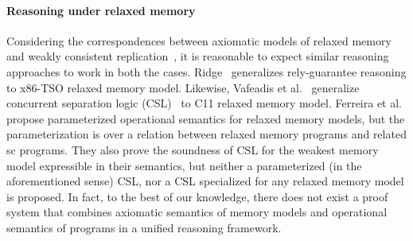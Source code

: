 \paragraph{Reasoning under relaxed memory} Considering the
correspondences between axiomatic models of relaxed
memory~\cite{battycpp} and weakly consistent
replication~\cite{burckhardt14}, it is reasonable to expect similar
reasoning approaches to work in both the cases. Ridge~\cite{rgtso}
generalizes rely-guarantee reasoning to x86-TSO relaxed memory model.
Likewise, Vafeadis et al.~\cite{rsl13} generalize concurrent
separation logic (CSL)~\cite{csl} to C11 relaxed memory model.
Ferreira et al.~\cite{ferreira10} propose parameterized operational
semantics for relaxed memory models, but the parameterization is over
a relation between relaxed memory programs and related {\sc sc}
programs. They also prove the soundness of CSL for the weakest memory
model expressible in their semantics, but neither a parameterized (in
the aforementioned sense) CSL, nor a CSL specialized for any relaxed
memory model is proposed. In fact, to the best of our knowledge, there
does not exist a proof system that combines axiomatic semantics of
memory models and operational semantics of programs in a unified
reasoning framework.

